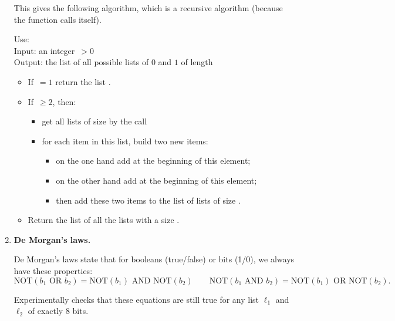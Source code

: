 \documentclass[11pt,class=report,crop=false]{standalone}
\begin{document}
\begin{activite}
\begin{enumerate}
  This gives the following algorithm, which is a recursive algorithm (because the function calls itself).
  \begin{algorithme}
  Use: \\
  Input: an integer \,$>0$\\
  Output: the list of all possible lists of $0$ and $1$ of length 

  \begin{itemize}
    \item If \,$=1$ return the list \ci{[ [0], [1] ]}.     
    \item If \,$\ge2$, then:
    \begin{itemize}
      \item get all lists of size  by the call 
      \item for each item in this list, build two new items:
       \begin{itemize} 
         \item on the one hand add  at the beginning of this element;
         \item on the other hand add  at the beginning of this element;
         \item then add these two items to the list of lists of size .
       \end{itemize}      
    \end{itemize}
    
    \item Return the list of all the lists with a size .
  \end{itemize}     
 \end{algorithme}  
  
    \item \textbf{De Morgan's laws.} 
    
    De Morgan's laws state that for booleans (true/false) or bits (1/0), we always have these properties:
    $$\text{NOT}( b_1 \text{ OR } b_2 ) = 
    \text{NOT}( b_1 )  \text{ AND } \text{NOT}(b_2)
    \qquad
    \text{NOT}( b_1 \text{ AND } b_2 ) = 
    \text{NOT}( b_1 )  \text{ OR } \text{NOT}(b_2).$$
    
    Experimentally checks that these equations are still true for any list $\ell_1$ and $\ell_2$ of exactly $8$ bits.
    
\end{enumerate}

\end{activite}
\end{document}
